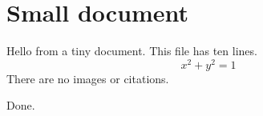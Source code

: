 \documentclass{article}
\begin{document}
\section{Small document}
Hello from a tiny document.
This file has ten lines.
\[x^2+y^2=1\]
There are no images or citations.
\par Done.
\end{document}
